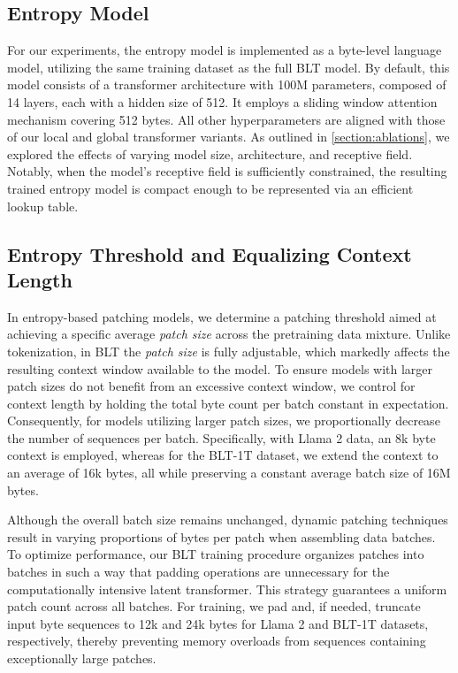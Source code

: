 \subsection{Entropy Model} For our experiments, the entropy model is implemented as a byte-level language model, utilizing the same training dataset as the full {\textsc BLT} model. By default, this model consists of a transformer architecture with 100M parameters, composed of 14 layers, each with a hidden size of 512. It employs a sliding window attention mechanism covering 512 bytes. All other hyperparameters are aligned with those of our local and global transformer variants. As outlined in \autoref{section:ablations}, we explored the effects of varying model size, architecture, and receptive field. Notably, when the model's receptive field is sufficiently constrained, the resulting trained entropy model is compact enough to be represented via an efficient lookup table.

\subsection{Entropy Threshold and Equalizing Context Length} In entropy-based patching models, we determine a patching threshold aimed at achieving a specific average \textit{patch size} across the pretraining data mixture. Unlike tokenization, in {\textsc BLT} the \textit{patch size} is fully adjustable, which markedly affects the resulting context window available to the model. To ensure models with larger patch sizes do not benefit from an excessive context window, we control for context length by holding the total byte count per batch constant in expectation. Consequently, for models utilizing larger patch sizes, we proportionally decrease the number of sequences per batch. Specifically, with Llama 2 data, an 8k byte context is employed, whereas for the {\textsc BLT}-1T dataset, we extend the context to an average of 16k bytes, all while preserving a constant average batch size of 16M bytes.

Although the overall batch size remains unchanged, dynamic patching techniques result in varying proportions of bytes per patch when assembling data batches. To optimize performance, our {\textsc BLT} training procedure organizes patches into batches in such a way that padding operations are unnecessary for the computationally intensive latent transformer. This strategy guarantees a uniform patch count across all batches. For training, we pad and, if needed, truncate input byte sequences to 12k and 24k bytes for Llama 2 and {\textsc BLT}-1T datasets, respectively, thereby preventing memory overloads from sequences containing exceptionally large patches.

